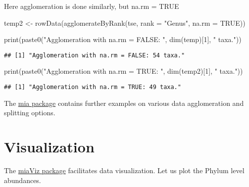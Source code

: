 \documentclass[
  oneside]{book}
\newenvironment{Shaded}{\begin{snugshade}}{\end{snugshade}}
\newcommand{\AttributeTok}[1]{\textcolor[rgb]{0.77,0.63,0.00}{#1}}
\newcommand{\ConstantTok}[1]{\textcolor[rgb]{0.00,0.00,0.00}{#1}}
\newcommand{\DecValTok}[1]{\textcolor[rgb]{0.00,0.00,0.81}{#1}}
\newcommand{\FunctionTok}[1]{\textcolor[rgb]{0.00,0.00,0.00}{#1}}
\newcommand{\NormalTok}[1]{#1}
\newcommand{\OtherTok}[1]{\textcolor[rgb]{0.56,0.35,0.01}{#1}}
\newcommand{\StringTok}[1]{\textcolor[rgb]{0.31,0.60,0.02}{#1}}
\begin{document}
Here agglomeration is done similarly, but na.rm = TRUE

\begin{Shaded}
\begin{Highlighting}[]
\NormalTok{temp2 }\OtherTok{\textless{}{-}} \FunctionTok{rowData}\NormalTok{(}\FunctionTok{agglomerateByRank}\NormalTok{(tse, }\AttributeTok{rank =} \StringTok{"Genus"}\NormalTok{, }\AttributeTok{na.rm =} \ConstantTok{TRUE}\NormalTok{))}

\FunctionTok{print}\NormalTok{(}\FunctionTok{paste0}\NormalTok{(}\StringTok{"Agglomeration with na.rm = FALSE: "}\NormalTok{, }\FunctionTok{dim}\NormalTok{(temp)[}\DecValTok{1}\NormalTok{], }\StringTok{" taxa."}\NormalTok{))}
\end{Highlighting}
\end{Shaded}

\begin{verbatim}
## [1] "Agglomeration with na.rm = FALSE: 54 taxa."
\end{verbatim}

\begin{Shaded}
\begin{Highlighting}[]
\FunctionTok{print}\NormalTok{(}\FunctionTok{paste0}\NormalTok{(}\StringTok{"Agglomeration with na.rm = TRUE: "}\NormalTok{, }\FunctionTok{dim}\NormalTok{(temp2)[}\DecValTok{1}\NormalTok{], }\StringTok{" taxa."}\NormalTok{))}
\end{Highlighting}
\end{Shaded}

\begin{verbatim}
## [1] "Agglomeration with na.rm = TRUE: 49 taxa."
\end{verbatim}

The \href{https://microbiome.github.io/mia/reference/index.html}{mia
package}
contains further examples on various data agglomeration and splitting
options.

\hypertarget{visualization}{%
\section{Visualization}\label{visualization}}

The \href{https://microbiome.github.io/miaViz/}{miaViz package} facilitates
data visualization. Let us plot the Phylum level abundances.
\end{document}
